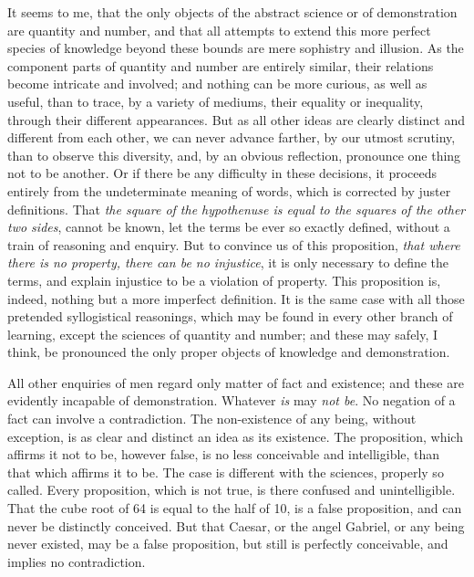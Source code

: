 \documentclass[]{article}
\begin{document}
\begin{sectionbody}
\humeparagraph  It seems to me, that the only objects of the abstract science or of demonstration are quantity and number, and that all attempts to extend this more perfect species of knowledge beyond these bounds are mere sophistry and illusion. As the component parts of quantity and number are entirely similar, their relations become intricate and involved; and nothing can be more curious, as well as useful, than to trace, by a variety of mediums, their equality or inequality, through their different appearances. But as all other ideas are clearly distinct and different from each other, we can never advance farther, by our utmost scrutiny, than to observe this diversity, and, by an obvious reflection, pronounce one thing not to be another. Or if there be any difficulty in these decisions, it proceeds entirely from the undeterminate meaning of words, which is corrected by juster definitions. That \emph{the square of the hypothenuse is equal to the squares of the other two sides}, cannot be known, let the terms be ever so exactly defined, without a train of reasoning and enquiry. But to convince us of this proposition, \emph{that where there is no property, there can be no injustice}, it is only necessary to define the terms, and explain injustice to be a violation of property. This proposition is, indeed, nothing but a more imperfect definition. It is the same case with all those pretended syllogistical reasonings, which may be found in every other branch of learning, except the sciences of quantity and number; and these may safely, I think, be pronounced the only proper objects of knowledge and demonstration.

\humeparagraph  All other enquiries of men regard only matter of fact and existence; and these are evidently incapable of demonstration. Whatever \emph{is} may \emph{not be}. No negation of a fact can involve a contradiction. The non-existence of any being, without exception, is as clear and distinct an idea as its existence. The proposition, which affirms it not to be, however false, is no less conceivable and intelligible, than that which affirms it to be. The case is different with the sciences, properly so called. Every proposition, which is not true, is there confused and unintelligible. That the cube root of 64 is equal to the half of 10, is a false proposition, and can never be distinctly conceived. But that Caesar, or the angel Gabriel, or any being never existed, may be a false proposition, but still is perfectly conceivable, and implies no contradiction.


\end{sectionbody}
\end{document}

